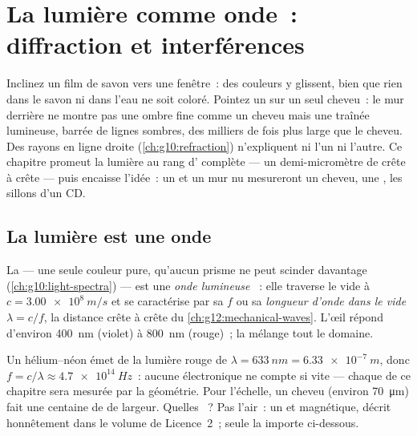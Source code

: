 \chapter{La lumière comme onde~: diffraction et interférences}\label{ch:g12:light-as-wave}

Inclinez un film de savon vers une fenêtre~: des couleurs y glissent,
bien que rien dans le savon ni dans l'eau ne soit coloré. Pointez un
 sur un seul cheveu~: le mur derrière ne montre pas une ombre
fine comme un cheveu mais une traînée lumineuse, barrée de lignes
sombres, des milliers de fois plus large que le cheveu. Des rayons en
ligne droite (\cref{ch:g10:refraction}) n'expliquent ni l'un ni l'autre.
Ce chapitre promeut la lumière au rang d' complète --- un
demi-micromètre de crête à crête --- puis encaisse l'idée~: un
 et un mur nu mesureront un cheveu, une
, les sillons d'un CD.

\section{La lumière est une onde}

\begin{definition}\label{def:g12:light-as-wave:lightwave}
La  --- une seule couleur pure, qu'aucun
prisme ne peut scinder davantage (\cref{ch:g10:light-spectra}) --- est
une \emph{onde lumineuse} ~: elle
traverse le vide à $c = \qty{3.00e8}{m/s}$ et se caractérise par sa
 $f$ ou sa \emph{longueur d'onde dans le
vide} $\lambda = c/f$, la
distance crête à crête du \cref{ch:g12:mechanical-waves}. L'œil
répond d'environ \qty{400}{nm} (violet) à \qty{800}{nm} (rouge)~; la
 mélange tout le domaine.
\end{definition}

\begin{example}\label{ex:g12:light-as-wave:orders}
Un  hélium--néon émet de la lumière rouge de
$\lambda = \qty{633}{nm} = \qty{6.33e-7}{m}$, donc
$f = c/\lambda \approx \qty{4.7e14}{Hz}$~: aucune électronique ne
compte si vite --- chaque  de ce chapitre sera
mesurée par la géométrie. Pour l'échelle, un cheveu (environ
\qty{70}{\micro m}) fait une centaine de  de
largeur. Quelles ~? Pas l'air~: un  et
magnétique, décrit honnêtement dans le volume de Licence~2~;
seule la  importe ci-dessous.
\end{example}

